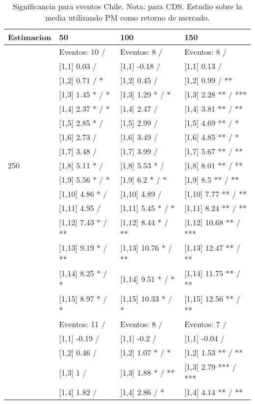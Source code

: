 \begin{table}

\caption{Significancia para eventos Chile. Nota: para CDS. Estudio sobre la media utilizando PM como retorno de mercado.}
\centering
\begin{tabular}[t]{llll}
\toprule
Estimacion & 50 & 100 & 150\\
\midrule
 & Eventos:  10 / & Eventos:  8 / & Eventos:  8 /\\
 & {}[1,1] 0.03  / & {}[1,1] -0.18  / & {}[1,1] 0.13  /\\
 & {}[1,2] 0.71  / * & {}[1,2] 0.45  / & {}[1,2] 0.99  / **\\
 & {}[1,3] 1.45 * / * & {}[1,3] 1.29 * / * & {}[1,3] 2.28 ** / ***\\
 & {}[1,4] 2.37 * / * & {}[1,4] 2.47  / & {}[1,4] 3.81 ** / **\\
\addlinespace
 & {}[1,5] 2.85 * / & {}[1,5] 2.99  / & {}[1,5] 4.69 ** / *\\
 & {}[1,6] 2.73  / & {}[1,6] 3.49  / & {}[1,6] 4.85 ** / *\\
 & {}[1,7] 3.48  / & {}[1,7] 3.99  / & {}[1,7] 5.67 ** / **\\
250 & {}[1,8] 5.11 * / & {}[1,8] 5.53 * / & {}[1,8] 8.01 ** / **\\
 & {}[1,9] 5.56 * / * & {}[1,9] 6.2 * / * & {}[1,9] 8.5 ** / **\\
\addlinespace
 & {}[1,10] 4.86 * / & {}[1,10] 4.89  / & {}[1,10] 7.77 ** / **\\
 & {}[1,11] 4.95  / & {}[1,11] 5.45 * / * & {}[1,11] 8.24 ** / **\\
 & {}[1,12] 7.43 * / ** & {}[1,12] 8.44 * / ** & {}[1,12] 10.68 ** / ***\\
 & {}[1,13] 9.19 * / ** & {}[1,13] 10.76 * / ** & {}[1,13] 12.47 ** / **\\
 & {}[1,14] 8.25 * / * & {}[1,14] 9.51 * / * & {}[1,14] 11.75 ** / **\\
\addlinespace
 & {}[1,15] 8.97 * / * & {}[1,15] 10.33 * / * & {}[1,15] 12.56 ** / **\\
 & Eventos:  11 / & Eventos:  8 / & Eventos:  7 /\\
 & {}[1,1] -0.19  / & {}[1,1] -0.2  / & {}[1,1] -0.04  /\\
 & {}[1,2] 0.46  / & {}[1,2] 1.07 * / * & {}[1,2] 1.53 ** / **\\
 & {}[1,3] 1  / & {}[1,3] 1.88 * / ** & {}[1,3] 2.79 *** / ***\\
\addlinespace
 & {}[1,4] 1.82  / & {}[1,4] 2.86  / * & {}[1,4] 4.14 ** / **\\

\end{tabular}
\end{table}
